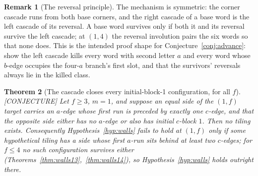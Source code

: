 \documentclass[11pt,reqno]{amsart}
\theoremstyle{plain}
\newtheorem{theorem}{Theorem}
\theoremstyle{definition}
\newtheorem{remark}[theorem]{Remark}
\newcommand{\lab}[1]{\hfill\textnormal{\footnotesize\textsc{[#1]}}}
\begin{document}
\begin{remark}[The reversal principle]\label{rem:reversal}
The mechanism is symmetric: the corner cascade runs from both base corners, and the right cascade
of a base word is the left cascade of its reversal. A base word survives only if both it and its
reversal survive the left cascade; at $(1,4)$ the reversal involution pairs the six words so that
none does. This is the intended proof shape for Conjecture~\ref{conj:advance}: show the left
cascade kills every word with second letter $a$ and every word whose $b$-edge occupies the
four-$a$ branch's first slot, and that the survivors' reversals always lie in the killed class.
\end{remark}

\begin{theorem}[The cascade closes every initial-block-1 configuration, for all $f$]\label{thm:e1cascade}\lab{CONJECTURE}
Let $f\ge3$, $m=1$, and suppose an equal side of the $(1,f)$ target carries an $a$-edge whose first
run is preceded by exactly one $c$-edge, and that the opposite side either has no $a$-edge or also
has initial $c$-block $1$. Then no tiling exists. Consequently Hypothesis~\ref{hyp:walls} fails to
hold at $(1,f)$ only if some hypothetical tiling has a side whose first $a$-run sits behind at least
two $c$-edges; for $f\le4$ no such configuration survives either
(Theorems~\ref{thm:walls13},~\ref{thm:walls14}), so Hypothesis~\ref{hyp:walls} holds outright there.
\end{theorem}
\end{document}
